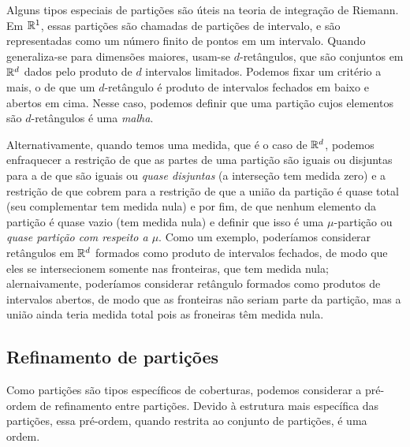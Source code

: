 Alguns tipos especiais de partições são úteis na teoria de integração de Riemann. Em $\mathbb{R}^1$, essas partições são chamadas de partições de intervalo, e são representadas como um número finito de pontos em um intervalo. Quando generaliza-se para dimensões maiores, usam-se $d$-retângulos, que são conjuntos em $\mathbb{R}^d$ dados pelo produto de $d$ intervalos limitados. Podemos fixar um critério a mais, o de que um $d$-retângulo é produto de intervalos fechados em baixo e abertos em cima. Nesse caso, podemos definir que uma partição cujos elementos são $d$-retângulos é uma \emph{malha}.

Alternativamente, quando temos uma medida, que é o caso de $\mathbb{R}^d$, podemos enfraquecer a restrição de que as partes de uma partição são iguais ou disjuntas para a de que são iguais ou \emph{quase disjuntas} (a interseção tem medida zero) e a restrição de que cobrem para a restrição de que a união da partição é quase total (seu complementar tem medida nula) e por fim, de que nenhum elemento da partição é quase vazio (tem medida nula) e definir que isso é uma $\mu$-partição ou \emph{quase partição com respeito a $\mu$}. Como um exemplo, poderíamos considerar retângulos em $\mathbb{R}^d$ formados como produto de intervalos fechados, de modo que eles se intersecionem somente nas fronteiras, que tem medida nula; alernaivamente, poderíamos considerar retângulo formados como produtos de intervalos abertos, de modo que as fronteiras não seriam parte da partição, mas a união ainda teria medida total pois as froneiras têm medida nula.

\subsection{Refinamento de partições}

Como partições são tipos específicos de coberturas, podemos considerar a pré-ordem de refinamento entre partições. Devido à estrutura mais específica das partições, essa pré-ordem, quando restrita ao conjunto de partições, é uma ordem.

